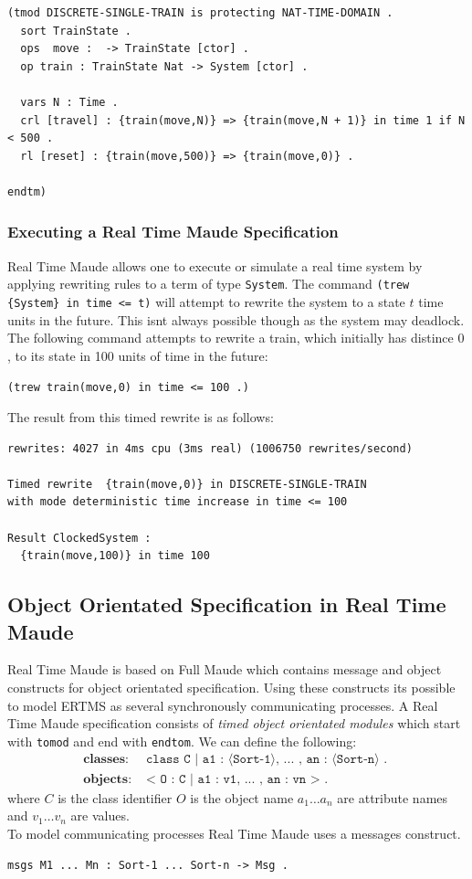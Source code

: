 \begin{verbatim}
(tmod DISCRETE-SINGLE-TRAIN is protecting NAT-TIME-DOMAIN .
  sort TrainState .
  ops  move :  -> TrainState [ctor] .
  op train : TrainState Nat -> System [ctor] .
 
  vars N : Time .
  crl [travel] : {train(move,N)} => {train(move,N + 1)} in time 1 if N < 500 .
  rl [reset] : {train(move,500)} => {train(move,0)} . 
         
endtm)
\end{verbatim}

\subsubsection*{Executing a Real Time Maude Specification}
Real Time Maude allows one to execute or simulate a real time system by applying rewriting rules to a term of type \texttt{System}.
The command \texttt{(trew \{System\} in time <= t)} will attempt to rewrite the system to a state $t$ time units in the future. This isnt always possible though as the system may deadlock. The following command attempts to rewrite a train, which initially has distince $0$, to its state in 100 units of time in the future: 
\begin{center}
\texttt{(trew {train(move,0)} in time <= 100 .)}
\end{center}

The result from this timed rewrite is as follows:
\begin{verbatim}
rewrites: 4027 in 4ms cpu (3ms real) (1006750 rewrites/second)

Timed rewrite  {train(move,0)} in DISCRETE-SINGLE-TRAIN 
with mode deterministic time increase in time <= 100

Result ClockedSystem :
  {train(move,100)} in time 100
\end{verbatim}


\subsection{Object Orientated Specification in Real Time Maude}
Real Time Maude is based on Full Maude which contains message and object constructs for object orientated specification. Using these constructs its possible to model ERTMS as several synchronously communicating processes. A Real Time Maude specification consists of  \emph{timed object orientated modules} which start with \texttt{tomod} and end with \texttt{endtom}.
\medskip
We can define the following:
\begin{align*}
\textbf{classes}: & \texttt{ class C | a1 : ⟨Sort-1⟩, ... , an : ⟨Sort-n⟩ . } \\
\textbf{objects}: & \texttt{ < O : C | a1 : v1, ... , an : vn >  . } 
\end{align*}
where $C$ is the class identifier $O$ is the object name  $a_1 \ldots a_n$ are attribute names and $v_1 \ldots v_n$ are values. \\
\medskip
To model communicating processes Real Time Maude uses a messages construct.
\begin{center}
\verb|msgs M1 ... Mn : Sort-1 ... Sort-n -> Msg . | 
\end{center}


